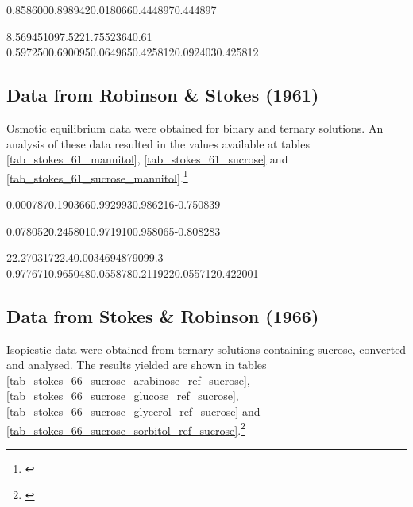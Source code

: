 %
	{\text{---}}{\text{---}}{\text{---}}{\text{---}}
\tablebisecond{\text{---}}{\text{---}}
%
	{0.858600}{0.898942}{0.018066}{0.444897}{\text{---}}{0.444897}


%
	{8.56945}{1097.52}{21.7552}{3640.61}
%
	{0.597250}{0.690095}{0.064965}{0.425812}{0.092403}{0.425812}

\FloatBarrier

\subsection{Data from Robinson \& Stokes (1961)}

Osmotic equilibrium data were obtained for binary and ternary solutions.
An analysis of these data resulted in the values available at tables
\ref{tab_stokes_61_mannitol}, \ref{tab_stokes_61_sucrose} and
\ref{tab_stokes_61_sucrose_mannitol}.\footnote{\cite{stokes1961}}


%
	{0.000787}{0.190366}{0.992993}{0.986216}{-0.750839}

%
	{0.078052}{0.245801}{0.971910}{0.958065}{-0.808283}

%
	{22.2703}{1722.4}{0.00346948}{79099.3}
%
	{0.977671}{0.965048}{0.055878}{0.211922}{0.055712}{0.422001}

\FloatBarrier

\subsection{Data from Stokes \& Robinson (1966)}

Isopiestic data were obtained from ternary solutions containing sucrose,
converted and analysed. The results yielded are shown in tables
\ref{tab_stokes_66_sucrose_arabinose_ref_sucrose},
\ref{tab_stokes_66_sucrose_glucose_ref_sucrose},
\ref{tab_stokes_66_sucrose_glycerol_ref_sucrose} and
\ref{tab_stokes_66_sucrose_sorbitol_ref_sucrose}.\footnote{\cite{stokes1966}}

